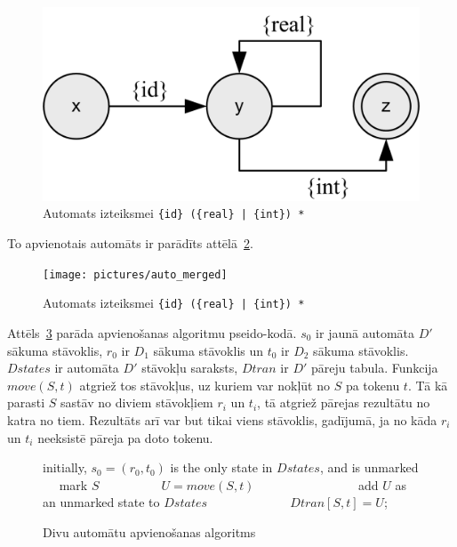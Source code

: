 \begin{figure}[H]
  \centering
    \includegraphics[scale=1.5]{pictures/auto_m_2}
  \caption{\label{fig:auto_m_2}Automats izteiksmei \texttt{\{id\} (\{real\} | \{int\}) *}}
\end{figure}

To apvienotais automāts ir parādīts attēlā~\ref{fig:auto_merge}.

\begin{figure}[H]
  \centering
    \texttt{[image: pictures/auto\_merged]}
  \caption{\label{fig:auto_merge}Automats izteiksmei \texttt{\{id\} (\{real\} | \{int\}) *}}
\end{figure}

Attēls~\ref{fig:uni_algorithm} parāda apvienošanas algoritmu pseido-kodā. $s_0$ ir jaunā automāta $D'$ sākuma stāvoklis, $r_0$ ir $D_1$ sākuma stāvoklis un $t_0$ ir $D_2$ sākuma stāvoklis. $Dstates$ ir automāta $D'$ stāvokļu saraksts, $Dtran$ ir $D'$ pāreju tabula. Funkcija $move (S, t)$ atgriež tos stāvokļus, uz kuriem var nokļūt no $S$ pa tokenu $t$. Tā kā parasti $S$ sastāv no diviem stāvokļiem $r_i$ un $t_i$, tā atgriež pārejas rezultātu no katra no tiem. Rezultāts arī var but tikai viens stāvoklis, gadījumā, ja no kāda $r_i$ un $t_i$ neeksistē pāreja pa doto tokenu.

\begin{figure}[h]
  \begin{algorithmic}
  \State initially, $s_0 = (r_0, t_0)$ is the only state in $Dstates$, and is unmarked
      \State mark $S$
       
          \State $U = move (S, t)$
              \State add $U$ as an unmarked state to $Dstates$
          \EndIf
          \State $Dtran [S, t] = U$;
      \EndFor
  \EndWhile
  \end{algorithmic}
  \caption{\label{fig:uni_algorithm}Divu automātu apvienošanas algoritms}
\end{figure}

